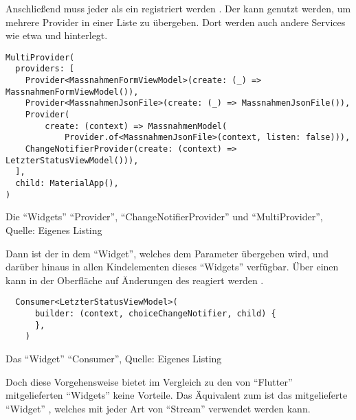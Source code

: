 Anschließend muss jeder  als ein  registriert werden . 
Der  kann genutzt werden, um mehrere Provider in einer Liste zu übergeben.
Dort werden auch andere Services wie etwa   und   hinterlegt.

\ifIncludeFigures
  \begin{listing}[h]
    \begin{verbatim}
MultiProvider(
  providers: [
    Provider<MassnahmenFormViewModel>(create: (_) => MassnahmenFormViewModel()),
    Provider<MassnahmenJsonFile>(create: (_) => MassnahmenJsonFile()),
    Provider(
        create: (context) => MassnahmenModel(
            Provider.of<MassnahmenJsonFile>(context, listen: false))),
    ChangeNotifierProvider(create: (context) => LetzterStatusViewModel())),
  ],
  child: MaterialApp(),
)
\end{verbatim}
    \caption[Die \enquote{Widgets} \enquote{Provider}, \enquote{ChangeNotifierProvider} und \enquote{MultiProvider}]{Die \enquote{Widgets} \enquote{Provider}, \enquote{ChangeNotifierProvider} und \enquote{MultiProvider}, Quelle: Eigenes Listing}
    \label{lst:MultiProvider}
  \end{listing}
\fi

Dann ist der  in dem \enquote{Widget}, welches dem Parameter  übergeben wird, und darüber hinaus in allen Kindelementen dieses \enquote{Widgets} verfügbar.
Über einen  kann in der Oberfläche auf Änderungen des  reagiert werden \Lst{\ref{lst:Consumer}}.

\ifIncludeFigures
  \begin{listing}[h]
    \begin{verbatim}
  Consumer<LetzterStatusViewModel>(
      builder: (context, choiceChangeNotifier, child) {
      },
    )
\end{verbatim}
    \caption[Das \enquote{Widget} \enquote{Consumer}]{Das \enquote{Widget} \enquote{Consumer}, Quelle: Eigenes Listing}
    \label{lst:Consumer}
  \end{listing}
\fi


Doch diese Vorgehensweise bietet im Vergleich zu den von \enquote{Flutter} mitgelieferten \enquote{Widgets} keine Vorteile.
Das Äquivalent zum  ist das mitgelieferte \enquote{Widget} ,
welches mit jeder Art von \enquote{Stream} verwendet werden kann.

